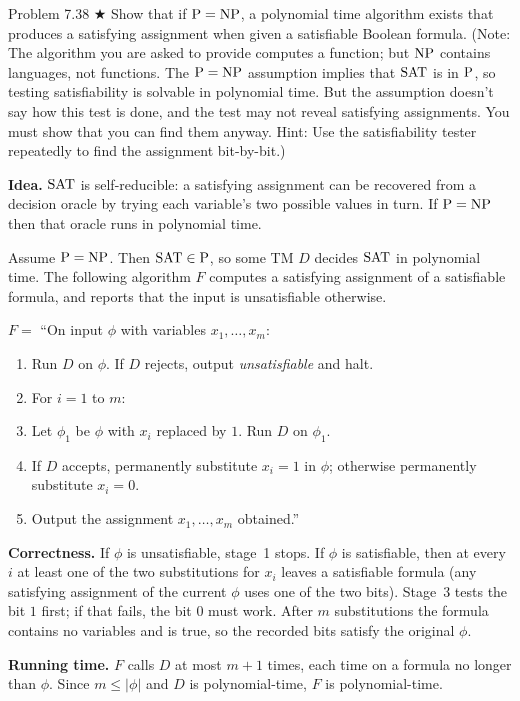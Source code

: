 \begin{question}{Problem 7.38 $\bigstar$}
Show that if $\mathrm{P}=\mathrm{NP}$, a polynomial time algorithm exists that produces a satisfying assignment when given a satisfiable Boolean formula. (Note: The algorithm you are asked to provide computes a function; but $\mathrm{NP}$ contains languages, not functions. The $\mathrm{P}=\mathrm{NP}$ assumption implies that $\mathrm{SAT}$ is in $\mathrm{P}$, so testing satisfiability is solvable in polynomial time. But the assumption doesn't say how this test is done, and the test may not reveal satisfying assignments. You must show that you can find them anyway. Hint: Use the satisfiability tester repeatedly to find the assignment bit-by-bit.)
\end{question}
\begin{soln}
\textbf{Idea.} $\mathrm{SAT}$ is self-reducible: a satisfying assignment can be recovered from a decision oracle by trying each variable's two possible values in turn. If $\mathrm{P}=\mathrm{NP}$ then that oracle runs in polynomial time.

Assume $\mathrm{P}=\mathrm{NP}$. Then $\mathrm{SAT}\in\mathrm{P}$, so some TM $D$ decides $\mathrm{SAT}$ in polynomial time. The following algorithm $F$ computes a satisfying assignment of a satisfiable formula, and reports that the input is unsatisfiable otherwise.

$F=$ ``On input $\phi$ with variables $x_1,\ldots,x_m$:
\begin{enumerate}
\item Run $D$ on $\phi$. If $D$ rejects, output \emph{unsatisfiable} and halt.
\item For $i=1$ to $m$:
\item \quad Let $\phi_1$ be $\phi$ with $x_i$ replaced by $1$. Run $D$ on $\phi_1$.
\item \quad If $D$ accepts, permanently substitute $x_i=1$ in $\phi$; otherwise permanently substitute $x_i=0$.
\item Output the assignment $x_1,\ldots,x_m$ obtained.''
\end{enumerate}

\textbf{Correctness.}
If $\phi$ is unsatisfiable, stage~1 stops. If $\phi$ is satisfiable, then at every $i$ at least one of the two substitutions for $x_i$ leaves a satisfiable formula (any satisfying assignment of the current $\phi$ uses one of the two bits). Stage~3 tests the bit $1$ first; if that fails, the bit $0$ must work. After $m$ substitutions the formula contains no variables and is true, so the recorded bits satisfy the original $\phi$.

\textbf{Running time.}
$F$ calls $D$ at most $m+1$ times, each time on a formula no longer than $\phi$. Since $m\le\lvert\phi\rvert$ and $D$ is polynomial-time, $F$ is polynomial-time.
\end{soln}

